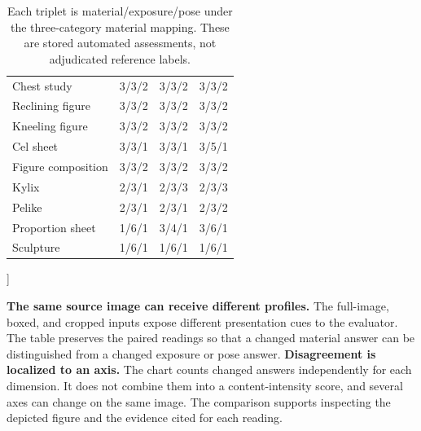 {\begin{minipage}{\textwidth}
\begin{table}[H]
\begin{tabularx}{\linewidth}{@{}Xccc@{}}
Chest study & 3/3/2 & 3/3/2 & 3/3/2 \\
Reclining figure & 3/3/2 & 3/3/2 & 3/3/2 \\
Kneeling figure & 3/3/2 & 3/3/2 & 3/3/2 \\
Cel sheet & 3/3/1 & 3/3/1 & 3/5/1 \\
Figure composition & 3/3/2 & 3/3/2 & 3/3/2 \\
Kylix & 2/3/1 & 2/3/3 & 2/3/3 \\
Pelike & 2/3/1 & 2/3/1 & 2/3/2 \\
Proportion sheet & 1/6/1 & 3/4/1 & 3/6/1 \\
Sculpture & 1/6/1 & 1/6/1 & 1/6/1 \\
\bottomrule
\end{tabularx}
\caption{Each triplet is material/exposure/pose under the three-category material mapping. These are stored automated assessments, not adjudicated reference labels.}\label{tab:apppresentation}
\end{table}
\end{minipage}}]

\textbf{The same source image can receive different profiles.} The full-image, boxed, and cropped inputs expose different presentation cues to the evaluator. The table preserves the paired readings so that a changed material answer can be distinguished from a changed exposure or pose answer.
\newpage
\textbf{Disagreement is localized to an axis.} The chart counts changed answers independently for each dimension. It does not combine them into a content-intensity score, and several axes can change on the same image. The comparison supports inspecting the depicted figure and the evidence cited for each reading.

